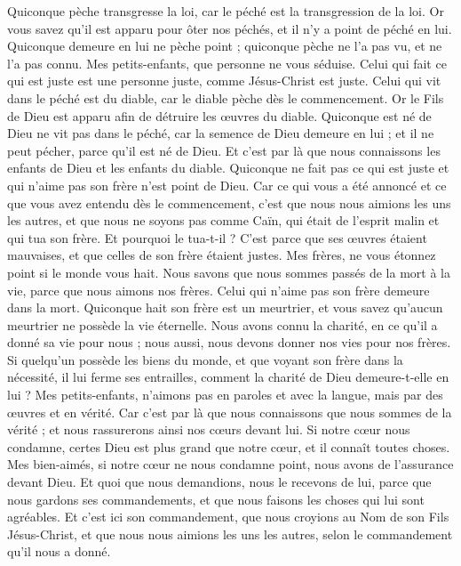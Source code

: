\begin{multicols}{2}
Quiconque pèche transgresse la loi, car le péché est la transgression de la loi.
Or vous savez qu'il est apparu pour ôter nos péchés, et il n'y a point de péché en lui.
Quiconque demeure en lui ne pèche point ; quiconque pèche ne l'a pas vu, et ne l'a pas connu.
Mes petits-enfants, que personne ne vous séduise. Celui qui fait ce qui est juste est une personne juste, comme Jésus-Christ est juste.
Celui qui vit dans le péché est du diable, car le diable pèche dès le commencement. Or le Fils de Dieu est apparu afin de détruire les œuvres du diable.
Quiconque est né de Dieu ne vit pas dans le péché, car la semence de Dieu demeure en lui ; et il ne peut pécher, parce qu'il est né de Dieu.
Et c'est par là que nous connaissons les enfants de Dieu et les enfants du diable. Quiconque ne fait pas ce qui est juste et qui n'aime pas son frère n'est point de Dieu.
Car ce qui vous a été annoncé et ce que vous avez entendu dès le commencement, c'est que nous nous aimions les uns les autres,
et que nous ne soyons pas comme Caïn, qui était de l'esprit malin et qui tua son frère. Et pourquoi le tua-t-il ? C'est parce que ses œuvres étaient mauvaises, et que celles de son frère étaient justes.
Mes frères, ne vous étonnez point si le monde vous hait.
Nous savons que nous sommes passés de la mort à la vie, parce que nous aimons nos frères. Celui qui n'aime pas son frère demeure dans la mort.
Quiconque hait son frère est un meurtrier, et vous savez qu'aucun meurtrier ne possède la vie éternelle.
Nous avons connu la charité, en ce qu'il a donné sa vie pour nous ; nous aussi, nous devons donner nos vies pour nos frères.
Si quelqu'un possède les biens du monde, et que voyant son frère dans la nécessité, il lui ferme ses entrailles, comment la charité de Dieu demeure-t-elle en lui ?
Mes petits-enfants, n'aimons pas en paroles et avec la langue, mais par des œuvres et en vérité.
Car c'est par là que nous connaissons que nous sommes de la vérité ; et nous rassurerons ainsi nos cœurs devant lui.
Si notre cœur nous condamne, certes Dieu est plus grand que notre cœur, et il connaît toutes choses.
Mes bien-aimés, si notre cœur ne nous condamne point, nous avons de l'assurance devant Dieu.
Et quoi que nous demandions, nous le recevons de lui, parce que nous gardons ses commandements, et que nous faisons les choses qui lui sont agréables.
Et c'est ici son commandement, que nous croyions au Nom de son Fils Jésus-Christ, et que nous nous aimions les uns les autres, selon le commandement qu'il nous a donné.

\end{multicols}
